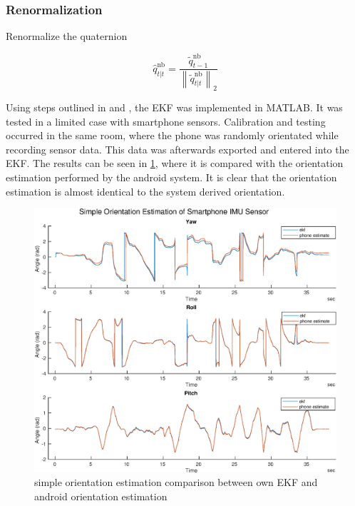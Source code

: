 \subsubsection{Renormalization}
Renormalize the quaternion

	\begin{equation}
	\hat{q}_{t | t}^{\mathrm{nb}}=\frac{\tilde{q}_{t-1}^{\mathrm{nb}}}{\left\|\tilde{q}_{t | t}^{\mathrm{nb}}\right\|_{2}}
	\end{equation}

Using steps outlined in \cite{Kok2017} and \cite{Linkoping2013}, the EKF was implemented in MATLAB. It was tested in a limited case with smartphone sensors. Calibration and testing occurred in the same room, where the phone was randomly orientated while recording sensor data. This data was afterwards exported and entered into the EKF. The results can be seen in \cref{fig:simple_stationary_ekf}, where it is compared with the orientation estimation performed by the android system. It is clear that the orientation estimation is almost identical to the system derived orientation.

\begin{figure}
	\centering
	\includegraphics[width=0.7\linewidth]{images/20201025_2015_simple_stationary_ekf}
	\caption{ simple orientation estimation comparison between own EKF and android orientation estimation}
	\label{fig:simple_stationary_ekf}
\end{figure}

